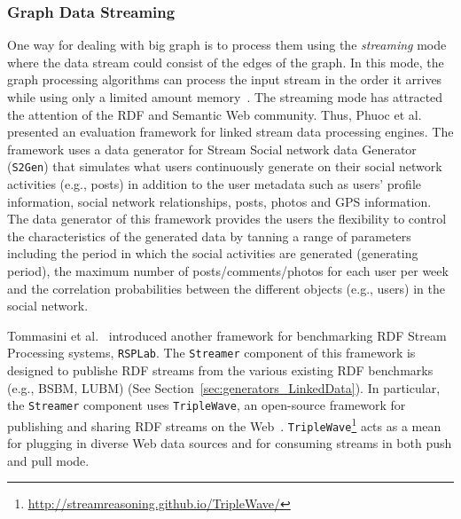 \subsubsection{Graph Data Streaming}
\label{sec:generators_streaming}
One way for dealing with big graph is to process them using the \emph{streaming} mode where the data stream could consist of the edges of the graph. In this mode, the graph processing algorithms can process the input stream in the order it arrives while using only a limited amount memory~\cite{mcgregor2014graph}. The streaming mode has attracted the attention of the RDF and Semantic Web community. Thus, Phuoc et al.~\cite{le2012linked} presented an evaluation framework for linked stream data processing engines. The framework uses a data generator for Stream Social network data Generator (\texttt{S2Gen}) that simulates what users continuously generate on their social network activities (e.g., posts) in addition to the  user metadata such as users' profile information, social network relationships, posts, photos and GPS information. The data generator of this framework provides the users the flexibility to control the characteristics of the generated data by tanning a range of parameters including the period in which the social activities are generated (generating period), the maximum number of posts/comments/photos for each user per week and the correlation probabilities between the different objects (e.g., users) in the social network.

Tommasini et al.~\cite{tommasini2017rsplab} introduced another framework for benchmarking RDF Stream Processing systems, \texttt{RSPLab}. The \texttt{Streamer} component of this framework is designed to publishe RDF streams from the various existing RDF benchmarks (e.g., BSBM, LUBM) (See Section~\ref{sec:generators_LinkedData}). In particular, the \texttt{Streamer}  component uses \texttt{TripleWave}, an open-source framework for publishing
and sharing RDF streams on the Web~\cite{mauri2016triplewave}.   \texttt{TripleWave}\footnote{\url{http://streamreasoning.github.io/TripleWave/}} acts as a mean for plugging in diverse Web data sources and for consuming streams in both push and pull mode.
